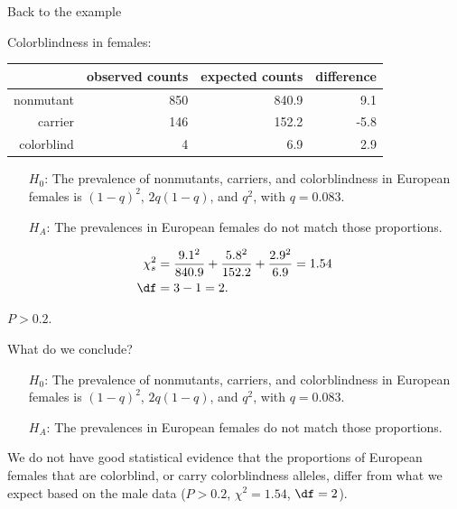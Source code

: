\begin{frame}{Back to the example}

    Colorblindness in females:
    \begin{center}
        \begin{tabular}{r|rrr}
            & observed counts & expected counts & difference\\
            \hline 
            nonmutant & 850 & 840.9 & 9.1 \\ 
            carrier &  146 & 152.2 & -5.8 \\ 
            colorblind & 4 & 6.9 & 2.9  \\
        \end{tabular}
    \end{center}

    \vspace{2em}

    \begin{itemize}
      \item[$H_0$:] The prevalence of nonmutants, carriers, and colorblindness in European females is $(1-q)^2$, $2q(1-q)$, and $q^2$, with $q=0.083$.
      \item[$H_A$:] The prevalences in European females do not match those proportions.
    \end{itemize}

    \vspace{1em}

    \begin{align*}
        \chi^2_s &= \frac{9.1^2}{840.9} + \frac{5.8^2}{152.2} + \frac{2.9^2}{6.9} = 1.54 \\
        \df &= 3-1 = 2 .
      \end{align*}
      
      \vspace{1em}

      \alert{$P>0.2$.}

\end{frame}



\begin{frame}{What do we conclude?}

    \begin{itemize}
      \item[$H_0$:] The prevalence of nonmutants, carriers, and colorblindness in European females is $(1-q)^2$, $2q(1-q)$, and $q^2$, with $q=0.083$.
      \item[$H_A$:] The prevalences in European females do not match those proportions.
    \end{itemize}
    \vspace{1em}

     We do not have good statistical evidence that the proportions of European females that are colorblind, 
    or carry colorblindness alleles, differ from what we expect based on the male data ($P>0.2$, $\chi^2=1.54$, $\df=2$).



\end{frame}




